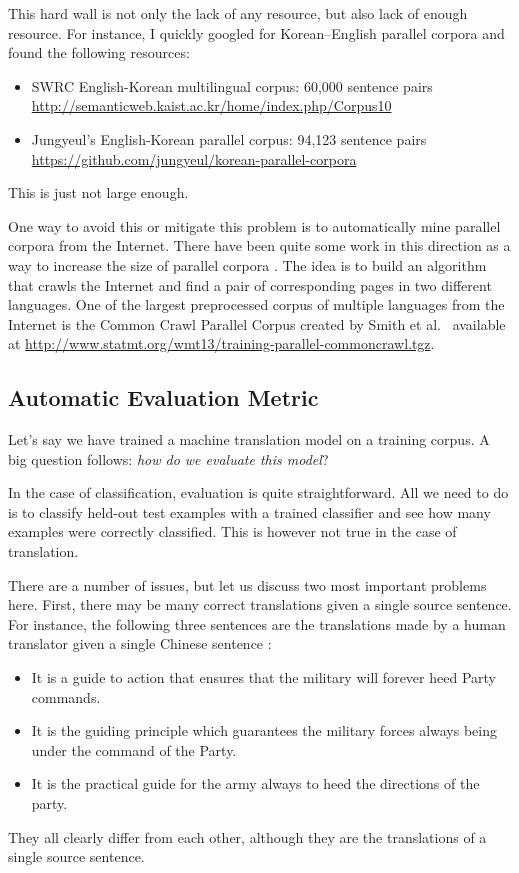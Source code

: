 \documentclass{report}
\begin{document}
This hard wall is not only the lack of any resource, but also lack of enough
resource. For instance, I quickly googled for Korean--English parallel corpora
and found the following resources:
\begin{itemize}
    \item SWRC English-Korean multilingual corpus: 60,000 sentence pairs
        \url{http://semanticweb.kaist.ac.kr/home/index.php/Corpus10}
    \item Jungyeul's English-Korean parallel corpus: 94,123 sentence pairs
        \url{https://github.com/jungyeul/korean-parallel-corpora}
\end{itemize}
This is just not large enough. 

One way to avoid this or mitigate this problem is to automatically mine parallel
corpora from the Internet. There have been quite some work in this direction as
a way to increase the size of parallel corpora
\cite{resnik2003web,zhang2006automatic}. The idea is to build an algorithm that
crawls the Internet and find a pair of corresponding pages in two different
languages. One of the largest preprocessed corpus of multiple languages from the
Internet is the Common Crawl Parallel Corpus created by Smith et
al.~\cite{smith2013dirt} available at
\url{http://www.statmt.org/wmt13/training-parallel-commoncrawl.tgz}.




\subsection{Automatic Evaluation Metric}
\label{sec:bleu}

Let's say we have trained a machine translation model on a training corpus. A
big question follows: {\em how do we evaluate this model}?

In the case of classification, evaluation is quite straightforward. All we need
to do is to classify held-out test examples with a trained classifier and see
how many examples were correctly classified. This is however not true in the
case of translation. 

There are a number of issues, but let us discuss two most important problems
here. First, there may be many correct translations given a single source
sentence. For instance, the following three sentences are the translations made
by a human translator given a single Chinese sentence \cite{papineni2002bleu}:
\begin{itemize}
    \itemsep 0em
    \item It is a guide to action that ensures that the military will forever
        heed Party commands.
    \item It is the guiding principle which guarantees the military forces
        always being under the command of the Party.
    \item It is the practical guide for the army always to heed the directions
        of the party.
\end{itemize}
They all clearly differ from each other, although they are the translations of a
single source sentence. 
\end{document}
